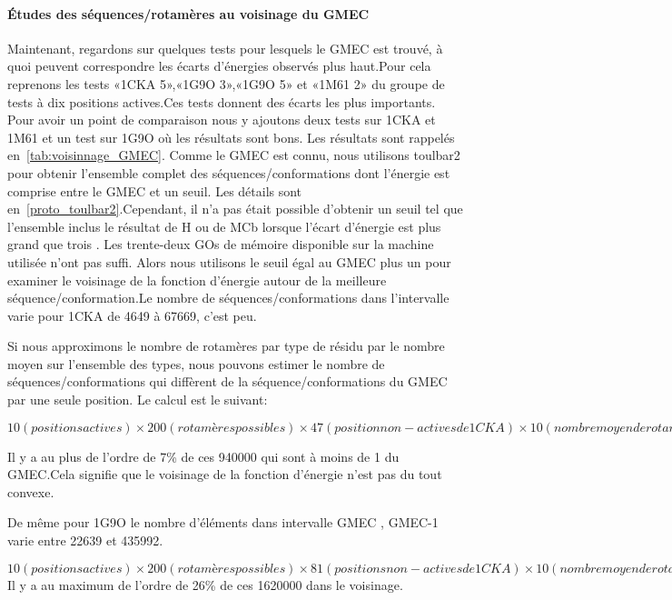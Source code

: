 \clearpage
   \paragraph{Études des séquences/rotamères au voisinage du GMEC}

Maintenant, regardons sur quelques tests pour lesquels le GMEC est trouvé, à quoi peuvent correspondre les écarts d'énergies observés plus haut.Pour cela reprenons les tests «1CKA 5»,«1G9O 3»,«1G9O 5» et «1M61 2» du groupe de tests à dix positions actives.Ces tests donnent des écarts les plus importants. Pour avoir un point de comparaison nous y ajoutons deux tests sur 1CKA et 1M61 et un test sur 1G9O où les résultats sont bons. Les résultats sont rappelés en~\ref{tab:voisinnage_GMEC}. Comme le GMEC est connu, nous utilisons toulbar2 pour obtenir l'ensemble complet des séquences/conformations dont l'énergie est comprise entre le GMEC et un seuil. Les détails sont en~\ref{proto_toulbar2}.Cependant, il n'a pas était possible d'obtenir un seuil tel que l'ensemble inclus le résultat de H ou de MCb lorsque l'écart d'énergie est plus grand que trois . Les trente-deux GOs de mémoire disponible sur la machine utilisée n'ont pas suffi. Alors nous utilisons le seuil égal au GMEC plus un pour examiner le voisinage de la fonction d'énergie autour de la meilleure séquence/conformation.Le nombre de séquences/conformations dans l'intervalle varie pour 1CKA de 4649 à 67669, c'est peu. 

Si nous approximons le nombre de rotamères par type de résidu par le nombre moyen sur l'ensemble des types, nous pouvons estimer le nombre de séquences/conformations qui diffèrent de la séquence/conformations du GMEC par une seule position. Le calcul est le suivant:

$10 (positions actives) \times 200 (rotamères possibles) \times 47 (position non-actives de 1CKA) \times 10 (nombre moyen de rotamères par résidu)=940000 $

Il y a au plus de l'ordre de 7\% de ces 940000 qui sont à moins de 1 du GMEC.Cela signifie que le voisinage de la fonction d'énergie n'est pas du tout convexe.


De même pour 1G9O le nombre d'éléments dans intervalle GMEC , GMEC-1 varie entre 22639 et 435992.


$10 (positions  actives) \times 200 (rotamères  possibles) \times 81 (positions  non-actives de 1CKA) \times 10 (nombre  moyen  de  rotamères  par  résidu)=1620000 $
Il y a au maximum de l'ordre de 26\% de ces 1620000 dans le voisinage.

